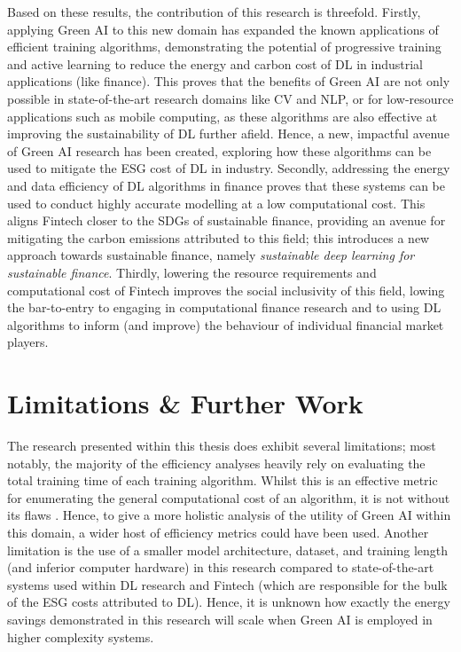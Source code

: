 \documentclass[a4paper, 11pt]{report}
\begin{document}
    Based on these results, the contribution of this research is threefold. Firstly, applying Green AI to this new domain has expanded the known applications of efficient training algorithms, demonstrating the potential of progressive training and active learning to reduce the energy and carbon cost of DL in industrial applications (like finance). This proves that the benefits of Green AI are not only possible in state-of-the-art research domains like CV and NLP, or for low-resource applications such as mobile computing, as these algorithms are also effective at improving the sustainability of DL further afield. Hence, a new, impactful avenue of Green AI research has been created, exploring how these algorithms can be used to mitigate the ESG cost of DL in industry. Secondly, addressing the energy and data efficiency of DL algorithms in finance proves that these systems can be used to conduct highly accurate modelling at a low computational cost. This aligns Fintech closer to the SDGs of sustainable finance, providing an avenue for mitigating the carbon emissions attributed to this field; this introduces a new approach towards sustainable finance, namely \emph{sustainable deep learning for sustainable finance}. Thirdly, lowering the resource requirements and computational cost of Fintech improves the social inclusivity of this field, lowing the bar-to-entry to engaging in computational finance research and to using DL algorithms to inform (and improve) the behaviour of individual financial market players.


    \section{Limitations \& Further Work}

    The research presented within this thesis does exhibit several limitations; most notably, the majority of the efficiency analyses heavily rely on evaluating the total training time of each training algorithm. Whilst this is an effective metric for enumerating the general computational cost of an algorithm, it is not without its flaws \citep{schwartz-2019}. Hence, to give a more holistic analysis of the utility of Green AI within this domain, a wider host of efficiency metrics could have been used. Another limitation is the use of a smaller model architecture, dataset, and training length (and inferior computer hardware) in this research compared to state-of-the-art systems used within DL research and Fintech (which are responsible for the bulk of the ESG costs attributed to DL). Hence, it is unknown how exactly the energy savings demonstrated in this research will scale when Green AI is employed in higher complexity systems. 
\end{document}
